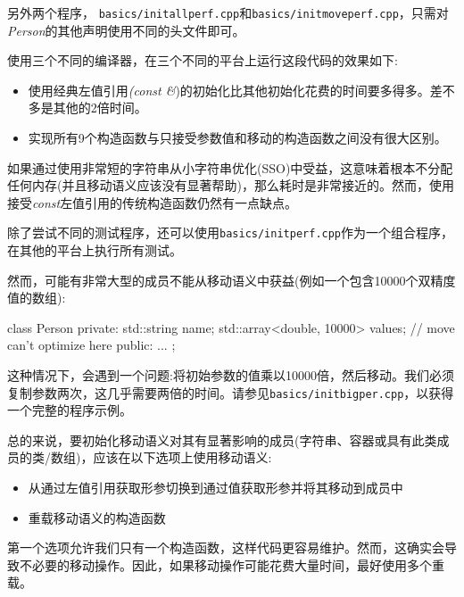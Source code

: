 另外两个程序， \texttt{basics/\allowbreak{}initallperf.cpp}和\texttt{basics/\allowbreak{}initmoveperf.cpp}，只需对\textit{Person}的其他声明使用不同的头文件即可。

使用三个不同的编译器，在三个不同的平台上运行这段代码的效果如下:\par

\begin{itemize}
  \item 使用经典左值引用\textit{(const \&})的初始化比其他初始化花费的时间要多得多。差不多是其他的2倍时间。
  \item 实现所有9个构造函数与只接受参数值和移动的构造函数之间没有很大区别。
\end{itemize}

如果通过使用非常短的字符串从小字符串优化(SSO)中受益，这意味着根本不分配任何内存(并且移动语义应该没有显著帮助)，那么耗时是非常接近的。然而，使用接受\textit{const}左值引用的传统构造函数仍然有一点缺点。\par

除了尝试不同的测试程序，还可以使用\texttt{basics/\allowbreak{}initperf.cpp}作为一个组合程序，在其他的平台上执行所有测试。\par

然而，可能有非常大型的成员不能从移动语义中获益(例如一个包含10000个双精度值的数组):\par

\begin{codebox}[cpp]
class Person {
private:
  std::string name;
  std::array<double, 10000> values; // move can’t optimize here
public:
  ...
};
\end{codebox}

这种情况下，会遇到一个问题:将初始参数的值乘以10000倍，然后移动。我们必须复制参数两次，这几乎需要两倍的时间。请参见\texttt{basics/\allowbreak{}initbigper.cpp}，以获得一个完整的程序示例。\par


总的来说，要初始化移动语义对其有显著影响的成员(字符串、容器或具有此类成员的类/数组)，应该在以下选项上使用移动语义:\par

\begin{itemize}
  \item 从通过左值引用获取形参切换到通过值获取形参并将其移动到成员中
  \item 重载移动语义的构造函数
\end{itemize}

第一个选项允许我们只有一个构造函数，这样代码更容易维护。然而，这确实会导致不必要的移动操作。因此，如果移动操作可能花费大量时间，最好使用多个重载。\par


